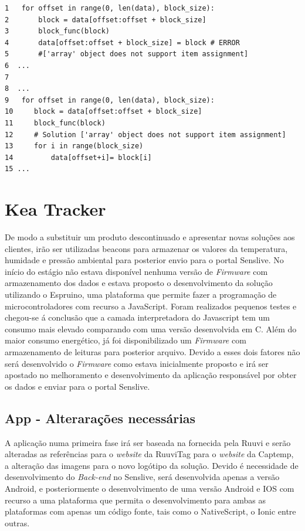 \begin{verbatim}
1   for offset in range(0, len(data), block_size):
2       block = data[offset:offset + block_size]
3       block_func(block)
4       data[offset:offset + block_size] = block # ERROR 
5       #['array' object does not support item assignment]
6  ...
7
8  ...
9   for offset in range(0, len(data), block_size):
10     block = data[offset:offset + block_size]
11     block_func(block)
12     # Solution ['array' object does not support item assignment]
13     for i in range(block_size)
14         data[offset+i]= block[i]
15 ...
\end{verbatim}

\section {Kea Tracker}

\par De modo a substituir um produto descontinuado e apresentar novas soluções aos clientes, irão ser utilizadas beacons para armazenar os valores da temperatura, humidade e pressão ambiental para posterior envio para o portal Senslive. No início do estágio não estava disponível nenhuma versão de \textit{Firmware} com armazenamento dos dados e estava proposto o desenvolvimento da solução utilizando o Espruino, uma plataforma que permite fazer a programação de microcontroladores com recurso a JavaScript. Foram realizados pequenos testes e chegou-se á conclusão que a camada interpretadora do Javascript tem um consumo mais elevado comparando com uma versão desenvolvida em C. Além do maior consumo energético, já foi disponibilizado um \textit{Firmware} com armazenamento de leituras para posterior arquivo. Devido a esses dois fatores não será desenvolvido o \textit{Firmware} como estava inicialmente proposto e irá ser apostado no melhoramento e desenvolvimento da aplicação responsável por obter os dados e enviar para o portal Senslive. 

\subsection{App - Alterarações necessárias}

\par A aplicação numa primeira fase irá ser baseada na fornecida pela Ruuvi e serão alteradas as referências para o \textit{website} da RuuviTag para o \textit{website} da Captemp, a alteração das imagens para o novo logótipo da solução. Devido é necessidade de desenvolvimento do \textit{Back-end} no Senslive, será desenvolvida apenas a versão Android, e posteriormente o desenvolvimento de uma versão Android e IOS com recurso a uma plataforma que permita o desenvolvimento para ambas as plataformas com apenas um código fonte, tais como o NativeScript\cite{nativescript}, o Ionic\cite{ionic} entre outras.

